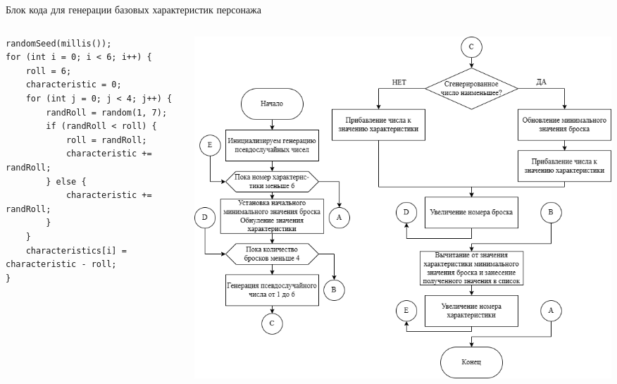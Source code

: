 \documentclass[12pt,a4paper,mathserif]{beamer}
\begin{document}
\begin{frame}[fragile]{{\small Блок кода для генерации базовых характеристик персонажа}}
\begin{columns}
\begin{column}{0.35\textwidth}
\tiny
\begin{verbatim}
randomSeed(millis());
for (int i = 0; i < 6; i++) {
    roll = 6;
    characteristic = 0;
    for (int j = 0; j < 4; j++) {
        randRoll = random(1, 7);
        if (randRoll < roll) {
            roll = randRoll;
            characteristic += randRoll;
        } else {
            characteristic += randRoll;
        }
    }
    characteristics[i] = characteristic - roll;
}
\end{verbatim}
\end{column}
\begin{column}{0.65\textwidth}
    \begin{center}
     \includegraphics[width=\textwidth]{generate_character.png}
     \end{center}
\end{column}
\end{columns}
\end{frame}
\end{document}
